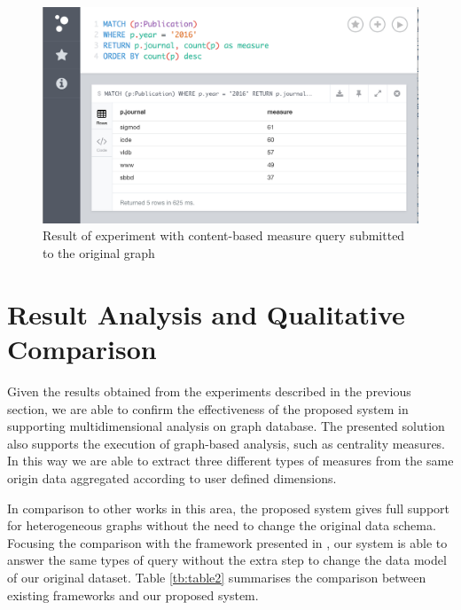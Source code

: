 \begin{figure}[!h]
\centering
\includegraphics[width=1\textwidth]{../exp_content_measure_original_graph.png}
\caption{Result of experiment with content-based measure query submitted to the original graph}
\label{fig:figure38}
\end{figure}

\section{Result Analysis and Qualitative Comparison}
Given the results obtained from the experiments described in the previous section, we are able to confirm the effectiveness of the proposed system in supporting multidimensional analysis on graph database. The presented solution also supports the execution of graph-based analysis, such as centrality measures. In this way we are able to extract three different types of measures from the same origin data aggregated according to user defined dimensions.

In comparison to other works in this area, the proposed system gives full support for heterogeneous graphs without the need to change the original data schema. Focusing the comparison with the framework presented in \cite{Ghrab2013}, our system is able to answer the same types of query without the extra step to change the data model of our original dataset. Table \ref{tb:table2} summarises the comparison between existing frameworks and our proposed system.

